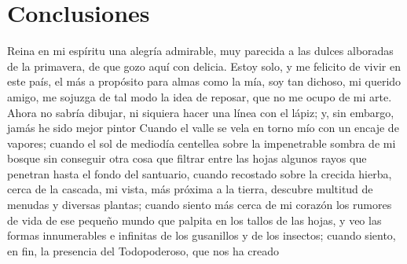 
\chapter{Conclusiones}

Reina en mi espíritu una alegría admirable, muy parecida a las dulces alboradas
de la primavera, de que gozo aquí con delicia. Estoy solo, y me felicito de
vivir en este país, el más a propósito para almas como la mía, soy tan dichoso,
mi querido amigo, me sojuzga de tal modo la idea de reposar, que no me ocupo de
mi arte. Ahora no sabría dibujar, ni siquiera hacer una línea con el lápiz; y,
sin embargo, jamás he sido mejor pintor Cuando el valle se vela en torno mío con
un encaje de vapores; cuando el sol de mediodía centellea sobre la impenetrable
sombra de mi bosque sin conseguir otra cosa que filtrar entre las hojas algunos
rayos que penetran hasta el fondo del santuario, cuando recostado sobre la
crecida hierba, cerca de la cascada, mi vista, más próxima a la tierra, descubre
multitud de menudas y diversas plantas; cuando siento más cerca de mi corazón
los rumores de vida de ese pequeño mundo que palpita en los tallos de las hojas,
y veo las formas innumerables e infinitas de los gusanillos y de los insectos;
cuando siento, en fin, la presencia del Todopoderoso, que nos ha creado
